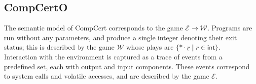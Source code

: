 \documentclass[sigplan,10pt,review,anonymous]{acmart}
\newcommand{\kw}[1]{\ensuremath{ \mathsf{#1} }}
\begin{document}
%
%
%
%
%

\subsection{CompCertO} %

The semantic model of CompCert corresponds to
the game $\mathcal{E} \rightarrow \mathcal{W}$.
Programs are run without any parameters,
and produce a single integer denoting their exit status;
this is described by the game $\mathcal{W}$
whose plays are $\{ * \cdot \underline{r} \mid r \in \kw{int} \}$.
Interaction with the environment
is captured as a trace of events from a predefined set,
each with output and input components.
These events correspond to system calls and volatile accesses,
and are described by the game $\mathcal{E}$.
\end{document}

